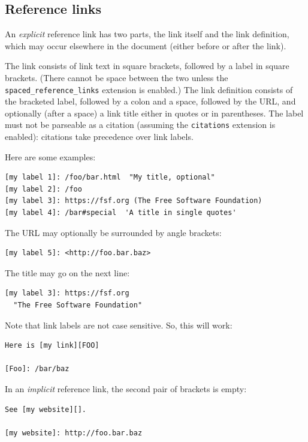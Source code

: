 \documentclass[
  b5paper
]{book}
\begin{document}
\subsection{Reference links}\label{reference-links}

An \emph{explicit} reference link has two parts, the link itself and the
link definition, which may occur elsewhere in the document (either
before or after the link).

The link consists of link text in square brackets, followed by a label
in square brackets. (There cannot be space between the two unless the
\texttt{spaced\_reference\_links} extension is enabled.) The link
definition consists of the bracketed label, followed by a colon and a
space, followed by the URL, and optionally (after a space) a link title
either in quotes or in parentheses. The label must not be parseable as a
citation (assuming the \texttt{citations} extension is enabled):
citations take precedence over link labels.

Here are some examples:

\begin{verbatim}
[my label 1]: /foo/bar.html  "My title, optional"
[my label 2]: /foo
[my label 3]: https://fsf.org (The Free Software Foundation)
[my label 4]: /bar#special  'A title in single quotes'
\end{verbatim}

The URL may optionally be surrounded by angle brackets:

\begin{verbatim}
[my label 5]: <http://foo.bar.baz>
\end{verbatim}

The title may go on the next line:

\begin{verbatim}
[my label 3]: https://fsf.org
  "The Free Software Foundation"
\end{verbatim}

Note that link labels are not case sensitive. So, this will work:

\begin{verbatim}
Here is [my link][FOO]

[Foo]: /bar/baz
\end{verbatim}

In an \emph{implicit} reference link, the second pair of brackets is
empty:

\begin{verbatim}
See [my website][].

[my website]: http://foo.bar.baz
\end{verbatim}
\end{document}
